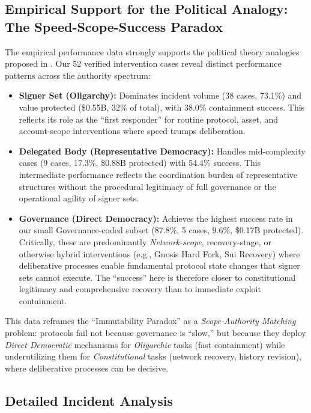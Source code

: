\documentclass[12pt]{article}
\begin{document}
\else
\subsection{Empirical Support for the Political Analogy: The Speed-Scope-Success Paradox}
\label{subsec:polia-validation}

The empirical performance data strongly supports the political theory analogies proposed in .
Our 52 verified intervention cases reveal distinct performance patterns across the authority spectrum:

\begin{itemize}
    \item \textbf{Signer Set (Oligarchy):} Dominates incident volume (38 cases, 73.1\%) and value protected (\$0.55B, 32\% of total), with 38.0\% containment success. This reflects its role as the ``first responder'' for routine protocol, asset, and account-scope interventions where speed trumps deliberation.
    
    \item \textbf{Delegated Body (Representative Democracy):} Handles mid-complexity cases (9 cases, 17.3\%, \$0.88B protected) with 54.4\% success. This intermediate performance reflects the coordination burden of representative structures without the procedural legitimacy of full governance or the operational agility of signer sets.
    
    \item \textbf{Governance (Direct Democracy):} Achieves the highest success rate in our small Governance-coded subset (87.8\%, 5 cases, 9.6\%, \$0.17B protected). Critically, these are predominantly \emph{Network-scope}, recovery-stage, or otherwise hybrid interventions (e.g., Gnosis Hard Fork, Sui Recovery) where deliberative processes enable fundamental protocol state changes that signer sets cannot execute. The ``success'' here is therefore closer to constitutional legitimacy and comprehensive recovery than to immediate exploit containment.
\end{itemize}

This data reframes the ``Immutability Paradox'' as a \emph{Scope-Authority Matching} problem: protocols fail not because governance is ``slow,'' but because they deploy \emph{Direct Democratic} mechanisms for \emph{Oligarchic} tasks (fast containment) while underutilizing them for \emph{Constitutional} tasks (network recovery, history revision), where deliberative processes can be decisive.


\subsection{Detailed Incident Analysis}
\label{subsec:detailed-cases}
\end{document}
